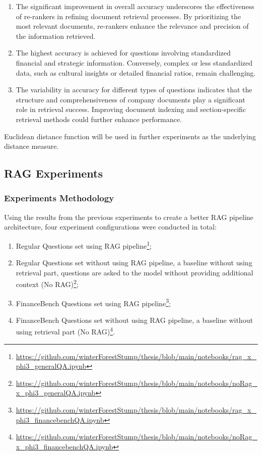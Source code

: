 \begin{enumerate}
\item The significant improvement in overall accuracy underscores the effectiveness of re-rankers in refining document retrieval processes. By prioritizing the most relevant documents, re-rankers enhance the relevance and precision of the information retrieved.
\item The highest accuracy is achieved for questions involving standardized financial and strategic information. Conversely, complex or less standardized data, such as cultural insights or detailed financial ratios, remain challenging.
\item The variability in accuracy for different types of questions indicates that the structure and comprehensiveness of company documents play a significant role in retrieval success. Improving document indexing and section-specific retrieval methods could further enhance performance.
\end{enumerate}

Euclidean distance function will be used in further experiments as the underlying distance measure.

\subsection{RAG Experiments}
\subsubsection{Experiments Methodology}
Using the results from the previous experiments to create a better RAG pipeline architecture, four experiment configurations were conducted in total:
\begin{enumerate}
\item Regular Questions set using RAG pipeline\footnote{\url{https://github.com/winterForestStump/thesis/blob/main/notebooks/rag_x_phi3_generalQA.ipynb}};
\item Regular Questions set without using RAG pipeline, a baseline without using retrieval part, questions are asked to the model without providing additional context (No RAG)\footnote{\url{https://github.com/winterForestStump/thesis/blob/main/notebooks/noRag_x_phi3_generalQA.ipynb}};
\item FinanceBench Questions set using RAG pipeline\footnote{\url{https://github.com/winterForestStump/thesis/blob/main/notebooks/rag_x_phi3_financebenchQA.ipynb}};
\item FinanceBench Questions set without using RAG pipeline, a baseline without using retrieval part (No RAG)\footnote{\url{https://github.com/winterForestStump/thesis/blob/main/notebooks/noRag_x_phi3_financebenchQA.ipynb}}.
\end{enumerate}

